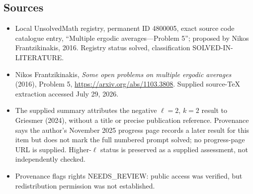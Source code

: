 \documentclass[11pt]{article}
\begin{document}
\subsection{Sources}
\begin{itemize}
\item Local UnsolvedMath registry, permanent ID 4800005, exact source code catalogue entry, ``Multiple ergodic averages---Problem 5''; proposed by Nikos Frantzikinakis, 2016. Registry status solved, classification SOLVED-IN-LITERATURE.
\item Nikos Frantzikinakis, \emph{Some open problems on multiple ergodic averages} (2016), Problem 5, \url{https://arxiv.org/abs/1103.3808}. Supplied source-TeX extraction accessed July 29, 2026.
\item The supplied summary attributes the negative $\ell=2$, $k=2$ result to Griesmer (2024), without a title or precise publication reference. Provenance says the author's November 2025 progress page records a later result for this item but does not mark the full numbered prompt solved; no progress-page URL is supplied. Higher-$\ell$ status is preserved as a supplied assessment, not independently checked.
\item Provenance flags rights NEEDS\_REVIEW: public access was verified, but redistribution permission was not established.
\end{itemize}
\end{document}
